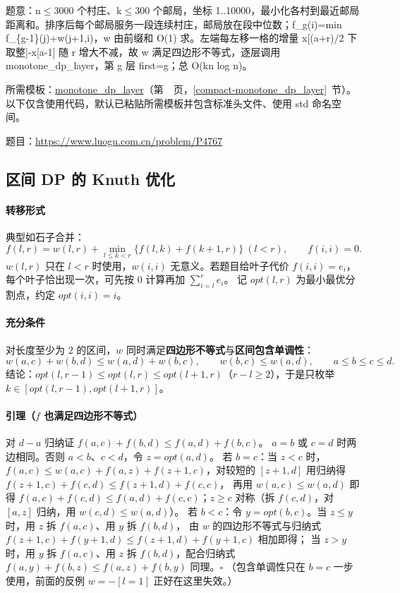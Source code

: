 \label{usage-example-363}

题意：n$\le$3000 个村庄、k$\le$300 个邮局，坐标 1..10000，最小化各村到最近邮局距离和。排序后每个邮局服务一段连续村庄，邮局放在段中位数；f\_g(i)=min f\_\{g-1\}(j)+w(j+1,i)，w 由前缀和 O(1) 求。左端每左移一格的增量 x[(a+r)/2 下取整]-x[a-1] 随 r 增大不减，故 w 满足四边形不等式，逐层调用 monotone\_dp\_layer，第 g 层 first=g；总 O(kn log n)。

所需模板：\hyperref[compact-monotone_dp_layer]{monotone\_\allowbreak{}dp\_\allowbreak{}layer}（第~\pageref{compact-monotone_dp_layer}~页，\ref{compact-monotone_dp_layer}~节）。以下仅含使用代码，默认已粘贴所需模板并包含标准头文件、使用 std 命名空间。

题目：\url{https://www.luogu.com.cn/problem/P4767}



\subsection{区间 DP 的 Knuth 优化}\label{knowledge-quadrangle-knuth}
\paragraph{转移形式} 典型如石子合并：
\[
 f(l,r)=w(l,r)+\min_{l\le k<r}\bigl\{f(l,k)+f(k+1,r)\bigr\}\ (l<r),\qquad f(i,i)=0.
\]
$w(l,r)$ 只在 $l<r$ 时使用，$w(i,i)$ 无意义。若题目给叶子代价 $f(i,i)=e_i$，每个叶子恰出现一次，可先按 0 计算再加 $\sum_{i=l}^re_i$。
记 $opt(l,r)$ 为最小最优分割点，约定 $opt(i,i)=i$。

\paragraph{充分条件} 对长度至少为 2 的区间，$w$ 同时满足\textbf{四边形不等式}与\textbf{区间包含单调性}：
\[
 w(a,c)+w(b,d)\le w(a,d)+w(b,c),\qquad w(b,c)\le w(a,d),\qquad a\le b\le c\le d.
\]
结论：$opt(l,r-1)\le opt(l,r)\le opt(l+1,r)$（$r-l\ge2$），于是只枚举 $k\in[opt(l,r-1),opt(l+1,r)]$。

\paragraph{引理（$f$ 也满足四边形不等式）} 对 $d-a$ 归纳证 $f(a,c)+f(b,d)\le f(a,d)+f(b,c)$。
$a=b$ 或 $c=d$ 时两边相同。否则 $a<b$、$c<d$，令 $z=opt(a,d)$。
若 $b=c$：当 $z<c$ 时，$f(a,c)\le w(a,c)+f(a,z)+f(z+1,c)$，对较短的 $[z+1,d]$ 用归纳得 $f(z+1,c)+f(c,d)\le f(z+1,d)+f(c,c)$，
再用 $w(a,c)\le w(a,d)$ 即得 $f(a,c)+f(c,d)\le f(a,d)+f(c,c)$；$z\ge c$ 对称（拆 $f(c,d)$，对 $[a,z]$ 归纳，用 $w(c,d)\le w(a,d)$）。
若 $b<c$：令 $y=opt(b,c)$。当 $z\le y$ 时，用 $z$ 拆 $f(a,c)$、用 $y$ 拆 $f(b,d)$，
由 $w$ 的四边形不等式与归纳式 $f(z+1,c)+f(y+1,d)\le f(z+1,d)+f(y+1,c)$ 相加即得；
当 $z>y$ 时，用 $y$ 拆 $f(a,c)$、用 $z$ 拆 $f(b,d)$，配合归纳式 $f(a,y)+f(b,z)\le f(a,z)+f(b,y)$ 同理。$\square$
（包含单调性只在 $b=c$ 一步使用，前面的反例 $w=-[l=1]$ 正好在这里失效。）

